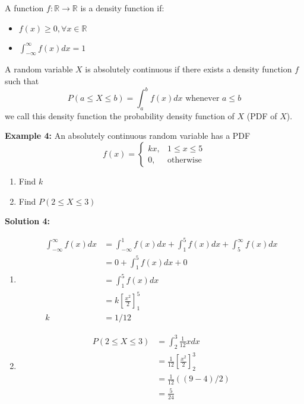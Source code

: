\documentclass[12pt]{article}
\begin{document}
\begin{tcolorbox}[title=Definition: Density Function]
	A function $f:\mathbb{R} \longrightarrow \mathbb{R}$ is a density function if:
	\begin{itemize}
		\item{$f(x) \geq 0, \forall x \in\mathbb{R}$}
		\item{$\int_{-\infty}^{\infty} f(x) dx = 1$}
	\end{itemize}
\end{tcolorbox}

\begin{tcolorbox}[title=Definition: Absolutely Continuous Random Variables]
	A random variable $X$ is absolutely continuous if there exists a density function $f$ such that $$P(a \leq X \leq b ) = \int_{a}^{b} f(x) dx \text{ whenever } a \leq b$$
	we call this density function the probability density function of $X$ (PDF of $X$).
\end{tcolorbox}

\textbf{Example 4:} An absolutely continuous random variable has a PDF $$f(x) = \begin{cases}
	kx, & 1 \leq x \leq 5\\
	0, & \text{otherwise}
\end{cases}
$$
\begin{enumerate}
	\item{Find $k$}
	\item{Find $P(2 \leq X \leq 3)$}
\end{enumerate}

\textbf{Solution 4:}
\begin{enumerate}
	\item{
	\begin{align*}
		\int_{-\infty}^{\infty} f(x) dx &= \int_{-\infty}^{1} f(x) dx + \int_{1}^{5} f(x) dx + \int_{5}^{\infty} f(x) dx\\
		&= 0 + \int_{1}^{5} f(x) dx + 0\\
		&= \int_{1}^{5} f(x) dx\\
		&= k[\frac{x^2}{2}]^{5}_{1}\\
		k &= 1/12
	\end{align*}
	}
	\item{
	\begin{align*}
		P(2 \leq X \leq 3) &= \int_{2}^{3} \frac{1}{12}x dx\\
		&= \frac{1}{12}[\frac{x^2}{2}]^{3}_{2}\\
		&= \frac{1}{12}((9-4)/2)\\
		&= \frac{5}{24}
	\end{align*}
	}
\end{enumerate}
\end{document}
